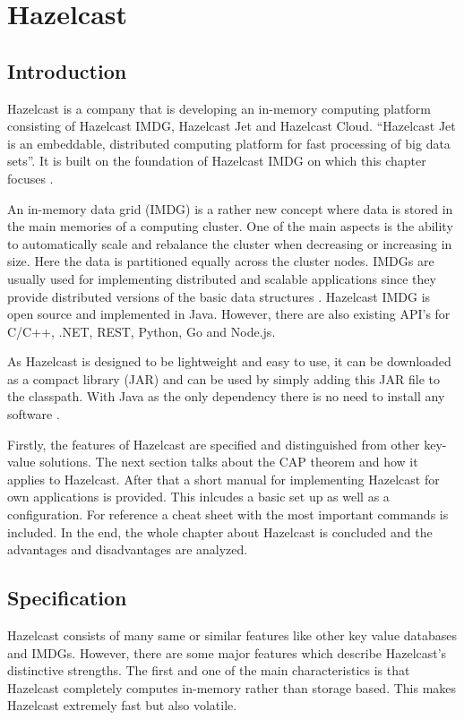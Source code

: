 \section{Hazelcast}

\subsection{Introduction}

Hazelcast is a company that is developing an in-memory computing platform consisting of Hazelcast IMDG, Hazelcast Jet and Hazelcast Cloud. “Hazelcast Jet is an embeddable, distributed computing platform for fast processing of big data sets”. It is built on the foundation of Hazelcast IMDG on which this chapter focuses \parencite{hazelcast}.

An in-memory data grid (IMDG) is a rather new concept where data is stored in the main memories of a computing cluster. One of the main aspects is the ability to automatically scale and rebalance the cluster when decreasing or increasing in size. Here the data is partitioned equally across the cluster nodes. IMDGs are usually used for implementing distributed and scalable applications since they provide distributed versions of the basic data structures \parencite{tasci2015}. Hazelcast IMDG is open source and implemented in Java. However, there are also existing API’s for C/C++, .NET, REST, Python, Go and Node.js.

As Hazelcast is designed to be lightweight and easy to use, it can be downloaded as a compact library (JAR) and can be used by simply adding this JAR file to the classpath. With Java as the only dependency there is no need to install any software \parencite{hazelcastmanual}.

Firstly, the features of Hazelcast are specified and distinguished from other key-value solutions. The next section talks about the CAP theorem and how it applies to Hazelcast. After that a short manual for implementing Hazelcast for own applications is provided. This inlcudes a basic set up as well as a configuration. For reference a cheat sheet with the most important commands is included. In the end, the whole chapter about Hazelcast is concluded and the advantages and disadvantages are analyzed. 
\subsection{Specification}
Hazelcast consists of many same or similar features like other key value databases and IMDGs. However, there are some major features which describe Hazelcast’s distinctive strengths.
The first and one of the main characteristics is that Hazelcast completely computes in-memory rather than storage based.  This makes Hazelcast extremely fast but also volatile.

